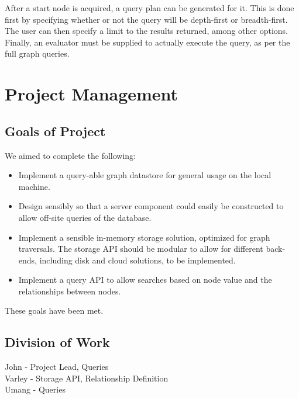 \documentclass[11pt]{article}
\begin{document}
After a start node is acquired, a query plan can be generated for it. This is done first by specifying whether or not the query will be depth-first or breadth-first. The user can then specify a limit to the results returned, among other options. Finally, an evaluator must be supplied to actually execute the query, as per the full graph queries.

\section{Project Management}

\subsection{Goals of Project}
We aimed to complete the following:

\begin{itemize}
\item Implement a query-able graph datastore for general usage on the local machine.
\item Design sensibly so that a server component could easily be constructed to allow off-site queries of the database.
\item Implement a sensible in-memory storage solution, optimized for graph traversals. The storage API should be modular to allow for different back-ends, including disk and cloud solutions, to be implemented.
\item Implement a query API to allow searches based on node value and the relationships between nodes.
\end{itemize}

These goals have been met.

\subsection{Division of Work}

John - Project Lead, Queries \\
Varley - Storage API, Relationship Definition\\
Umang -  Queries \\




\end{document}
